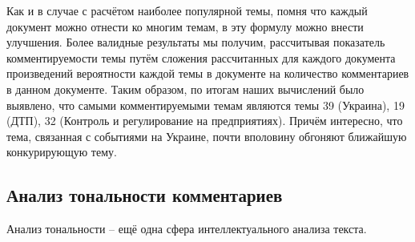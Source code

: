 Как и в случае с расчётом наиболее популярной темы, помня что каждый документ можно отнести ко многим темам,  в эту формулу можно внести улучшения. Более валидные результаты мы получим, рассчитывая показатель комментируемости темы путём сложения рассчитанных для каждого документа произведений вероятности каждой темы в документе на количество комментариев в данном документе. Таким образом, по итогам наших вычислений было выявлено, что самыми комментируемыми темам являются темы 39 (Украина), 19 (ДТП), 32 (Контроль и регулирование на предприятиях). Причём интересно, что тема, связанная с событиями на Украине, почти вполовину обгоняют ближайшую конкурирующую тему. 


\subsection{Анализ тональности комментариев}
Анализ тональности -- ещё одна сфера интеллектуального анализа текста.

